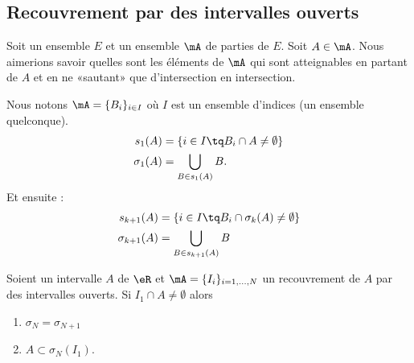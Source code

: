 \subsection{Recouvrement par des intervalles ouverts}

Soit un ensemble \( E\) et un ensemble \( \mA\) de parties de \( E\). Soit \( A\in \mA\). Nous aimerions savoir quelles sont les éléments de \( \mA\) qui sont atteignables en partant de \( A\) et en ne «sautant» que d'intersection en intersection.

Nous notons \( \mA=\{ B_i \}_{i\in I}\) où \( I\) est un ensemble d'indices (un ensemble quelconque).
\begin{subequations}
    \begin{align}
        s_1(A)&=\{  i\in I\tq B_i\cap A\neq \emptyset   \}\\
        \sigma_1(A)&=\bigcup_{B\in s_1(A)}B.
    \end{align}
\end{subequations}
Et ensuite :
\begin{subequations}
    \begin{align}
        s_{k+1}(A)&=\{ i\in I\tq B_i\cap \sigma_k(A)\neq \emptyset \}\\
        \sigma_{k+1}(A)&=\bigcup_{B\in s_{k+1}(A)}B
    \end{align}
\end{subequations}

\begin{lemma}
    Soient un intervalle \( A\) de \( \eR\) et \( \mA=\{ I_i \}_{i=1,\ldots, N}\) un recouvrement de \( A\) par des intervalles ouverts. Si \( I_1\cap A\neq \emptyset\) alors
    \begin{enumerate}
        \item
            \( \sigma_{N}=\sigma_{N+1}\)
        \item
            \( A\subset \sigma_N(I_1)\).
    \end{enumerate}
\end{lemma}

